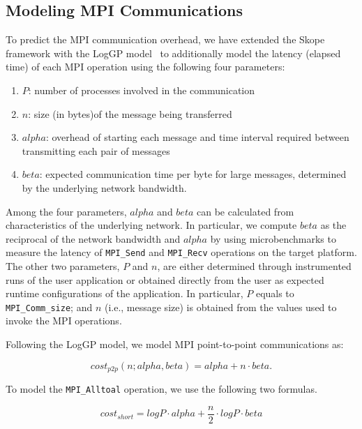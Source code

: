 \subsection{Modeling MPI Communications}

To predict the MPI communication overhead, we have extended the Skope framework with the LogGP
model~\cite{loggp} to additionally model the latency (elapsed time) of
each MPI operation using the following four parameters:

\begin{enumerate}

\item $P$: number of processes involved in the communication

\item $n$: size (in bytes)of the message being transferred

\item $alpha$: overhead of starting each message and time interval
  required between transmitting each pair of messages

\item $beta$: expected communication time per byte for large messages,
  determined by the underlying network bandwidth.

\end{enumerate}

Among the four parameters, $alpha$ and $beta$ can be calculated from
characteristics of the underlying network.  In particular, we compute
$beta$ as the reciprocal of the network bandwidth and $alpha$ by using
microbenchmarks to measure the latency of \texttt{MPI\_Send} and
\texttt{MPI\_Recv} operations on the target platform.  The other two
parameters, $P$ and $n$, are either determined through instrumented
runs of the user application or obtained directly from the user as
expected runtime configurations of the application.  In particular,
$P$ equals to \texttt{MPI\_Comm\_size}; and $n$ (i.e., message size)
is obtained from the values used to invoke the MPI operations.

Following the LogGP model, we model MPI point-to-point communications
as:

\begin{equation}
cost_{p2p}(n;alpha,beta) = alpha + n\cdot beta .
\end{equation}

To model the \texttt{MPI\_Alltoal} operation, we use the following two
formulas.

\begin{equation}
  cost_{short} = log P\cdot alpha + \frac{n}{2}\cdot log P\cdot beta
\end{equation}

